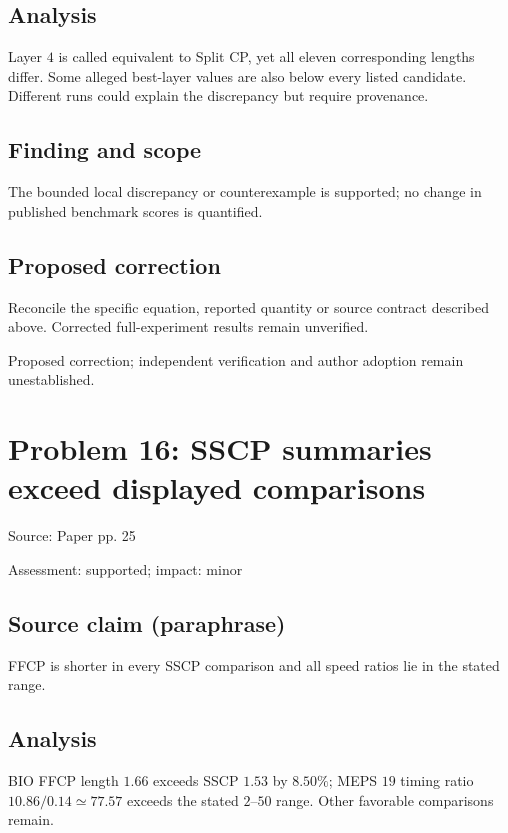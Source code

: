 \documentclass[11pt]{article}
\begin{document}
\subsection*{Analysis}

Layer \(4\) is called equivalent to Split CP, yet all eleven corresponding lengths differ. Some alleged best-layer values are also below every listed candidate. Different runs could explain the discrepancy but require provenance.

\subsection*{Finding and scope}

The bounded local discrepancy or counterexample is supported; no change in published benchmark scores is quantified.

\subsection*{Proposed correction}

Reconcile the specific equation, reported quantity or source contract described above. Corrected full-experiment results remain unverified.

Proposed correction; independent verification and author adoption remain unestablished.

\section*{Problem 16: SSCP summaries exceed displayed comparisons}

Source: Paper pp. 25

Assessment: supported; impact: minor

\subsection*{Source claim (paraphrase)}

FFCP is shorter in every SSCP comparison and all speed ratios lie in the stated range.

\subsection*{Analysis}

BIO FFCP length \(1.66\) exceeds SSCP \(1.53\) by \(8.50\%\); MEPS \(19\) timing ratio \(10.86/0.14\simeq77.57\) exceeds the stated \(2\)–\(50\) range. Other favorable comparisons remain.
\end{document}
